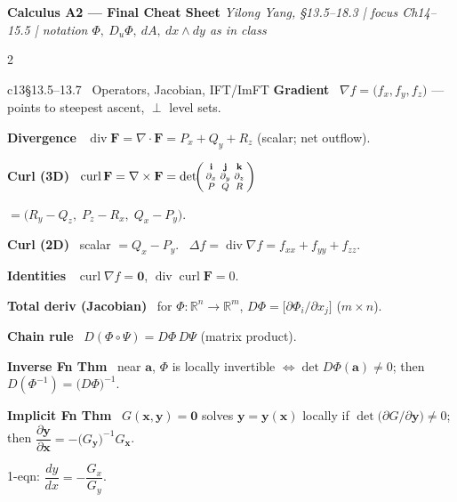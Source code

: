 \documentclass[10pt]{extarticle}
\newcommand{\h}[1]{{\bfseries #1}\ }
\newcommand{\R}{\mathbb{R}}
\newcommand{\grad}{\nabla}
\renewcommand{\div}{\operatorname{div}}
\newcommand{\curl}{\operatorname{curl}}
\newcommand{\F}{\mathbf{F}}
\begin{document}
\begin{center}\vspace{-3mm}
{\large\bfseries Calculus A2 --- Final Cheat Sheet}\quad
{\scriptsize \textit{Yilong Yang, §13.5--18.3 \;|\; focus Ch14--15.5 \;|\; notation $\Phi,\ D_u\Phi,\ dA,\ dx\wedge dy$ as in class}}
\end{center}
\vspace{-1mm}

\begin{multicols}{2}

\begin{tbox}{c13}{§13.5--13.7 \ Operators, Jacobian, IFT/ImFT}
\h{Gradient} $\grad f=\big(f_{x},f_{y},f_{z}\big)$ — points to steepest ascent, $\perp$ level sets.\par
\h{Divergence} $\div\F=\grad\!\cdot\!\F=P_x+Q_y+R_z$ (scalar; net outflow).\par
\h{Curl (3D)} $\curl\F=\grad\times\F=\det\!\begin{psmallmatrix}\mathbf i&\mathbf j&\mathbf k\\ \partial_x&\partial_y&\partial_z\\ P&Q&R\end{psmallmatrix}$\par
$=\big(R_y-Q_z,\;P_z-R_x,\;Q_x-P_y\big)$.\par
\h{Curl (2D)} scalar $=Q_x-P_y$.\quad \h{Laplacian} $\Delta f=\div\grad f=f_{xx}+f_{yy}+f_{zz}$.\par
\h{Identities} $\curl\grad f=\mathbf 0$,\;\; $\div\curl\F=0$.\par
\h{Total deriv (Jacobian)} for $\Phi:\R^n\!\to\!\R^m$, $D\Phi=\big[\partial\Phi_i/\partial x_j\big]$ ($m\times n$).\par
\h{Chain rule} $D(\Phi\circ\Psi)=D\Phi\,D\Psi$ (matrix product).\par
\h{Inverse Fn Thm} near $\mathbf a$, $\Phi$ is locally invertible $\iff \det D\Phi(\mathbf a)\neq 0$; then $D(\Phi^{-1})=\big(D\Phi\big)^{-1}$.\par
\h{Implicit Fn Thm} $G(\mathbf x,\mathbf y)=\mathbf0$ solves $\mathbf y=\mathbf y(\mathbf x)$ locally if $\det\!\big(\partial G/\partial\mathbf y\big)\neq0$; then $\dfrac{\partial \mathbf y}{\partial \mathbf x}=-\big(G_{\mathbf y}\big)^{-1}G_{\mathbf x}$.\par
1-eqn: $\dfrac{dy}{dx}=-\dfrac{G_x}{G_y}$.
\end{tbox}


\end{multicols}
\end{document}
